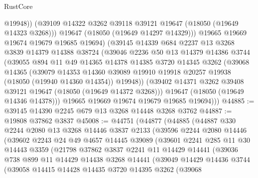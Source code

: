 \begin{lexlean}{RustCore}
\begin{coremodule}
              @19948))
          (@39109 @14322 @3262 @39118 @39121 @19647 (@18050 (@19649 @14323 @3268)))
          @19647
          (@18050 (@19649 @14297 @14329)))
        @19665
        @19669
        @19674
        @19679
        @19685
        @19694)
      (@39145
        @14339
        @684
        @2237
        @13
        @3268
        @3839
        @14379
        @14388
        @38724
        (@39046
          @2236
          @50
          @13
          @14379
          @14386
          @3744
          (@39055
            @894
            @11
            @49
            @14365
            @14378
            @14385
            @3720
            @14345
            @3262
            (@39068
              @14365
              (@39079
                @14353
                @14360
                @39089
                @19910
                @19918
                @20257
                @19938
                (@18050 (@19940 @14360 @14354))
                @19948))
            (@39402 @14371 @3262 @39408 @39121 @19647 (@18050 (@19649 @14372 @3268)))
            @19647
            (@18050 (@19649 @14346 @14378)))
          @19665
          @19669
          @19674
          @19679
          @19685
          @19694)))
@44885 := @39145 @14390 @2245 @679 @13 @3268 @14448 @3268 @3762
@44887 := @19808 @37862 @3837
@45008 := @44751
    (@44877
      (@44885
        (@44887
          @330
          @2244
          @2080
          @13
          @3268
          @14446
          @3837
          @2133
          (@39596
            @2244
            @2080
            @14446
            (@39602
              @2243
              @24
              @49
              @4657
              @14445
              @39089
              (@39601
                @2241
                @285
                @11
                @30
                @14443
                @3359
                (@21798
                  @37862
                  @3837
                  @2241
                  @11
                  @14429
                  @14441
                  (@39036
                    @738
                    @899
                    @11
                    @14429
                    @14438
                    @3268
                    @14441
                    (@39049
                      @14429
                      @14436
                      @3744
                      (@39058
                        @14415
                        @14428
                        @14435
                        @3720
                        @14395
                        @3262
                        (@39068

\end{coremodule}
\end{lexlean}
